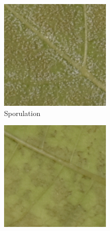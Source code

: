 \documentclass[english]{article}
\begin{document}
\begin{figure}[H]
    \centering
    \begin{subfigure}[b]{0.2\linewidth}
        \includegraphics[width=\linewidth]{p_viticola/resources/images/2023_a_oiv_sporulation.png}
        \caption{Sporulation}\label{fig:sporulation}
    \end{subfigure}
    \begin{subfigure}[b]{0.2\linewidth}
        \includegraphics[width=\linewidth]{p_viticola/resources/images/2023_a_oiv_stains.png}

\end{subfigure}
\end{figure}
\end{document}
